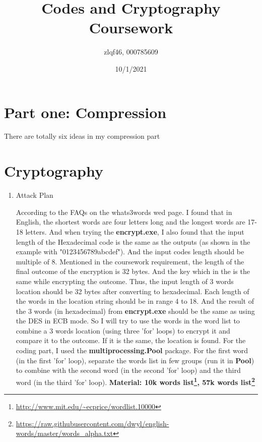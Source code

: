 \documentclass[margin 2cm]{report}
\title{\textbf{Codes and Cryptography Coursework}}
\author{zlqf46, 000785609}
\date{10/1/2021}
\begin{document}
\maketitle
\section[1]{\Large Part one: Compression}
\normalsize\indent\setlength{\parindent}{2em}There are totally six ideas in my compression part

\newpage
\Large\section[2]{Cryptography}

\begin{enumerate}
\normalsize\item[1)]{Attack Plan}
\begin{spacing}{1.5}
\newline\normalsize\indent\setlength{\parindent}{2em}According to the FAQs on the whats3words wed page. I found that in English, the shortest words are four letters long and the longest words are 17-18 letters. And when trying the \textbf{encrypt.exe}, I also found that the input length of the Hexadecimal code is the same as the outputs (as shown in the example with "0123456789abcdef"). And the input codes length should be multiple of 8. \newline Mentioned in the coursework requirement, the length of the final outcome of the encryption is 32 bytes. And the key which in the  is the same while encrypting the outcome. \newline Thus, the input length of 3 words location should be 32 bytes after converting to hexadecimal. Each length of the words in the location string should be in range 4 to 18. And the result of the 3 words (in hexadecimal) from \textbf{encrypt.exe} should be the same as using the DES in ECB mode. So I will try to use the words in the word list to combine a 3 words location (using three 'for' loops) to encrypt it and compare it to the outcome. If it is the same, the location is found. For the coding part, I used the \textbf{multiprocessing.Pool} package. For the first word (in the first 'for' loop), separate the words list in few groups (run it in \textbf{Pool}) to combine with the second word (in the second 'for' loop)  and the third word (in the third 'for' loop). \newline\textbf{Material: 10k words list\footnote[1]{\url{http://www.mit.edu/~ecprice/wordlist.10000}}, 57k words list\footnote[2]{\url{https://raw.githubusercontent.com/dwyl/english-words/master/words_alpha.txt}}}
\end{spacing}


\end{enumerate}
\end{document}
